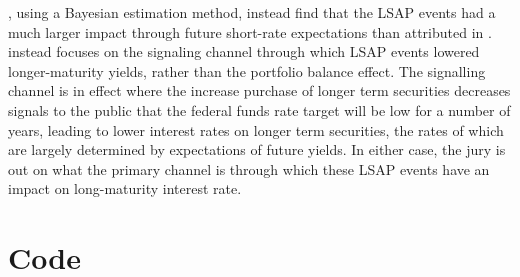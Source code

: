 \documentclass{article}
\numberwithin{equation}{section}
\begin{document}
\citet{bauerrudebusch2011}, using a Bayesian estimation method, instead find
that the LSAP events had a much larger impact through future short-rate
expectations than attributed in \citet{gagnon2010large}.
\citet{bauerrudebusch2011} instead focuses on the signaling channel through
which LSAP events lowered longer-maturity yields, rather than the portfolio
balance effect. The signalling channel is in effect where the increase purchase
of longer term securities decreases signals to the public that the federal
funds rate target will be low for a number of years, leading to lower interest
rates on longer term securities, the rates of which are largely determined by
expectations of future yields. In either case, the jury is out on what the
primary channel is through which these LSAP events have an impact on
long-maturity interest rate.



%
%
%

\section{Code}


%
\end{document}
